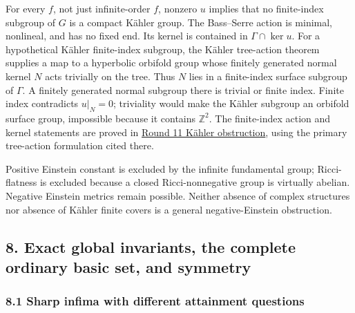\documentclass[
  english,
]{article}
\begin{document}
For every \(f\), not just infinite-order \(f\), nonzero \(u\) implies
that no finite-index subgroup of \(G\) is a compact Kähler group. The
Bass--Serre action is minimal, nonlineal, and has no fixed end. Its
kernel is contained in \(\Gamma\cap\ker u\). For a hypothetical Kähler
finite-index subgroup, the Kähler tree-action theorem supplies a map to
a hyperbolic orbifold group whose finitely generated normal kernel \(N\)
acts trivially on the tree. Thus \(N\) lies in a finite-index surface
subgroup of \(\Gamma\). A finitely generated normal subgroup there is
trivial or finite index. Finite index contradicts \(u|_N=0\); triviality
would make the Kähler subgroup an orbifold surface group, impossible
because it contains \(\mathbb Z^2\). The finite-index action and kernel
statements are proved in \href{../proofs/round11_kahler.md}{Round 11
Kähler obstruction}, using the primary tree-action formulation cited
there.

Positive Einstein constant is excluded by the infinite fundamental
group; Ricci-flatness is excluded because a closed Ricci-nonnegative
group is virtually abelian. Negative Einstein metrics remain possible.
Neither absence of complex structures nor absence of Kähler finite
covers is a general negative-Einstein obstruction.

\hypertarget{exact-global-invariants-the-complete-ordinary-basic-set-and-symmetry}{%
\subsection{8. Exact global invariants, the complete ordinary basic set,
and
symmetry}\label{exact-global-invariants-the-complete-ordinary-basic-set-and-symmetry}}

\hypertarget{sharp-infima-with-different-attainment-questions}{%
\subsubsection{8.1 Sharp infima with different attainment
questions}\label{sharp-infima-with-different-attainment-questions}}
\end{document}
